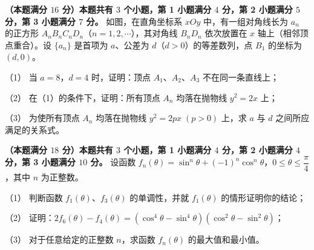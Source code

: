 \begin{question}
\textbf{（本题满分 $16$ 分）本题共有 $3$ 个小题，第 1 小题满分 $4$ 分，第 2 小题满分 $5$ 分，第 3 小题满分 $7$ 分。} 如图，在直角坐标系 $xOy$ 中，有一组对角线长为 $a_n$ 的正方形 $A_nB_nC_nD_n$（$n=1,2,\cdots$），其对角线 $B_nD_n$ 依次放置在 $x$ 轴上（相邻顶点重合）。设 $\{a_n\}$ 是首项为 $a$、公差为 $d$（$d>0$）的等差数列，点 $B_1$ 的坐标为 $(d,0)$。

（1） 当 $a=8$，$d=4$ 时，证明：顶点 $A_1$、$A_2$、$A_3$ 不在同一条直线上；

（2） 在（1）的条件下，证明：所有顶点 $A_n$ 均落在抛物线 $y^2=2x$ 上；

（3） 为使所有顶点 $A_n$ 均落在抛物线 $y^2=2px\;(p>0)$ 上，求 $a$ 与 $d$ 之间所应满足的关系式。
\nopagebreak[4]
\begin{center}\end{center}
\nopagebreak[4]
\end{question}
\begin{question}
\textbf{（本题满分 $18$ 分）本题共有 $3$ 个小题，第 1 小题满分 $4$ 分，第 2 小题满分 $4$ 分，第 3 小题满分 $10$ 分。} 设函数 $f_n(\theta)=\sin^n\theta+(-1)^n\cos^n\theta$，$0\le\theta\le\dfrac{\pi}{4}$，其中 $n$ 为正整数。

（1） 判断函数 $f_1(\theta)$、$f_3(\theta)$ 的单调性，并就 $f_1(\theta)$ 的情形证明你的结论；

（2） 证明：$2f_6(\theta)-f_4(\theta)=(\cos^4\theta-\sin^4\theta)(\cos^2\theta-\sin^2\theta)$；

（3） 对于任意给定的正整数 $n$，求函数 $f_n(\theta)$ 的最大值和最小值。

\end{question}